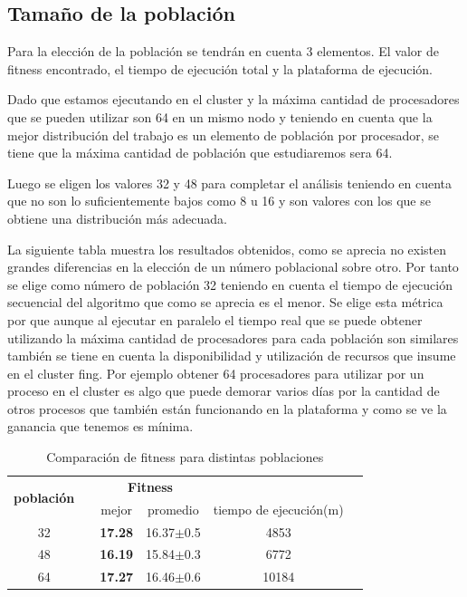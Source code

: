 \subsection{Tamaño de la población}

Para la elección de la población se tendrán en cuenta 3 elementos. El valor de fitness encontrado, el tiempo de ejecución total y la plataforma de ejecución.

Dado que estamos ejecutando en el cluster y la máxima cantidad de procesadores que se pueden utilizar son 64 en un mismo nodo y teniendo en cuenta que la mejor distribución del trabajo es un elemento de población por procesador, se tiene que la máxima cantidad de población que estudiaremos sera 64.

Luego se eligen los valores 32 y 48 para completar el análisis teniendo en cuenta que no son lo suficientemente bajos como 8 u 16 y son valores con los que se obtiene una distribución más adecuada.

La siguiente tabla muestra los resultados obtenidos, como se aprecia no existen grandes diferencias en la elección de un número poblacional sobre otro. Por tanto se elige como número de población 32 teniendo en cuenta el tiempo de ejecución secuencial del algoritmo que como se aprecia es el menor. Se elige esta métrica por que aunque al ejecutar en paralelo el tiempo real que se puede obtener utilizando la máxima cantidad de procesadores para cada población son similares también se tiene en cuenta la disponibilidad y utilización de recursos que insume en el cluster fing. Por ejemplo obtener 64 procesadores para utilizar por un proceso en el cluster es algo que puede demorar varios días por la cantidad de otros procesos que también están funcionando en la plataforma y como se ve la ganancia que tenemos es mínima.

\begin{table}
	\renewcommand{\arraystretch}{1.2}
	\caption{Comparación de fitness para distintas poblaciones}
	\label{table:parametro_poblacion}
	\centering
	\begin{tabular}{ccrrcr}
		\hline
		\multirow{2}{*}{\textbf{población}} & & 
		\multicolumn{2}{c}{\textbf{Fitness}} \\
		\cline{3-4}
		& & \multicolumn{1}{c}{mejor} 
		& \multicolumn{1}{c}{promedio} 
		& \multicolumn{1}{c}{tiempo de ejecución(m)} \\
		\hline
		32 & & \textbf{17.28} & 16.37$\pm$0.5 & 4853\\
		48 & & \textbf{16.19} & 15.84$\pm$0.3 & 6772\\
		64 & & \textbf{17.27} & 16.46$\pm$0.6 & 10184\\
		\hline
	\end{tabular}
\end{table}




